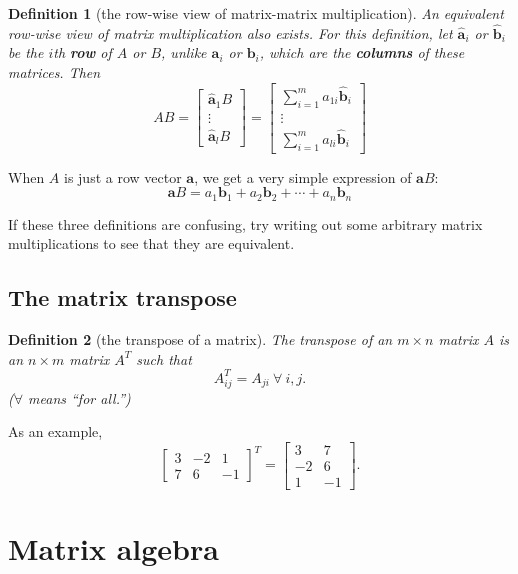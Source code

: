 \documentclass[draft,12pt]{report}
\newtheorem{definition}{Definition}
\renewcommand{\vec}[1]{\mathbf{#1}}
\begin{document}
\begin{definition}[the row-wise view of matrix-matrix multiplication]
    An equivalent row-wise view of matrix multiplication also exists. For this definition, let $\vec{\hat{a}}_i$ or $\vec{\hat{b}}_i$ be the $i$th \textbf{row} of $A$ or $B$, unlike $\vec{a}_i$ or $\vec{b}_i$, which are the \textbf{columns} of these matrices. Then
    \[ AB = \begin{bmatrix} \vec{\hat{a}}_1 B \\ \vdots \\ \vec{\hat{a}}_l B \end{bmatrix} = \begin{bmatrix} \sum_{i = 1}^m a_{1i} \vec{\hat{b}}_i \\ \vdots \\ \sum_{i = 1}^m a_{li} \vec{\hat{b}}_i \end{bmatrix} \]
\end{definition}
\noindent
When $A$ is just a row vector $\vec{a}$, we get a very simple expression of $\vec{a}B$:
\[ \vec{a}B = a_1\vec{b}_1 + a_2\vec{b}_2 + \cdots + a_n\vec{b}_n \]

If these three definitions are confusing, try writing out some arbitrary matrix multiplications to see that they are equivalent.

\subsection{The matrix transpose}

\begin{definition}[the transpose of a matrix]
    The transpose of an $m \times n$ matrix $A$ is an $n \times m$ matrix $A^T$ such that
    \[ A^T_{ij} = A_{ji}\ \forall\ i, j. \]
    ($\forall$ means ``for all.'')
\end{definition}
\noindent
As an example,
\[ \begin{bmatrix}
    3 & -2 & 1 \\
    7 & 6 & -1
\end{bmatrix}^T = \begin{bmatrix}
    3 & 7 \\
    -2 & 6 \\
    1 & -1
\end{bmatrix}. \]

\section{Matrix algebra}
\end{document}
